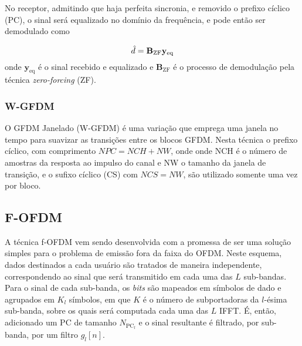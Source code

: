 No receptor, admitindo que haja perfeita sincronia, e removido o prefixo cíclico (PC), o  sinal será equalizado no domínio da frequência, e pode então ser demodulado como \par

\begin{equation}
    \label{eq:dhat}
	\hat{d}=  \mathbf{B}_\textrm{ZF}\mathbf{y}_{\text{eq}}\\
\end{equation}
\noindent onde $\mathbf{y}_{\text{eq}}$ é o sinal recebido e equalizado e $\mathbf{B}_\textrm{ZF}$ é o processo de demodulação pela técnica \textit{zero-forcing} (ZF). \par


\subsubsection{W-GFDM}

O GFDM Janelado (W-GFDM) é uma variação que emprega uma janela no tempo para suavizar as transições entre os blocos GFDM. Nesta técnica o prefixo cíclico, com comprimento $NPC = NCH + NW$, onde onde NCH é o número de amostras da resposta ao impulso do canal e NW o tamanho da janela de transição, e o sufixo cíclico (CS) com $NCS = NW$, são utilizado somente uma vez por bloco.\par

\subsection{F-OFDM}

A técnica f-OFDM vem sendo desenvolvida com a promessa de ser uma solução simples para o problema de emissão fora da faixa do OFDM. Neste esquema, dados destinados a cada usuário são tratados de maneira independente, correspondendo ao sinal que será transmitido em cada uma das $L$ sub-bandas. Para o sinal de cada sub-banda, os \textit{bits} são mapeados em símbolos de dado e agrupados em $K_{l}$ símbolos, em que $K$ é o número de subportadoras da $l$-ésima sub-banda, sobre os quais será computada cada uma das $L$ IFFT. É, então, adicionado um PC de tamanho $N_{\text{PC}_{l}}$ e o sinal resultante é filtrado, por sub-banda, por um filtro $g_{l}[n]$. \par

